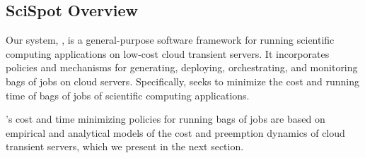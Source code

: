 \subsection{SciSpot Overview}

Our system, \sysname, is a general-purpose software framework for running scientific computing applications on low-cost cloud transient servers.
It incorporates policies and mechanisms for generating, deploying, orchestrating, and monitoring bags of jobs on cloud servers. 
Specifically, \sysname seeks to minimize the cost and running time of bags of jobs of scientific computing applications.



\sysname's cost and time minimizing policies for running bags of jobs are based on empirical and analytical models of the cost and preemption dynamics of cloud transient servers, which we present in the next section. 



